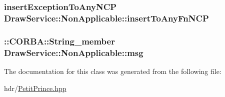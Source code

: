 \subsubsection[{\texorpdfstring{insert\+To\+Any\+Fn\+N\+CP}{insertToAnyFnNCP}}]{ insert\+Exception\+To\+Any\+N\+CP Draw\+Service\+::\+Non\+Applicable\+::insert\+To\+Any\+Fn\+N\+CP\hspace{0.3cm}{\ttfamily [static]}}\hypertarget{class_draw_service_1_1_non_applicable_a1616cdc51c85c7a0b695c5977cd7ef2e}{}\label{class_draw_service_1_1_non_applicable_a1616cdc51c85c7a0b695c5977cd7ef2e}
\subsubsection[{\texorpdfstring{msg}{msg}}]{\setlength{\rightskip}{0pt plus 5cm}\+::C\+O\+R\+B\+A\+::\+String\+\_\+member Draw\+Service\+::\+Non\+Applicable\+::msg}\hypertarget{class_draw_service_1_1_non_applicable_a80d5412b7ad22c14c85808108d88e6c8}{}\label{class_draw_service_1_1_non_applicable_a80d5412b7ad22c14c85808108d88e6c8}


The documentation for this class was generated from the following file\+:\begin{DoxyCompactItemize}
\item 
hdr/\hyperlink{_petit_prince_8hpp}{Petit\+Prince.\+hpp}\end{DoxyCompactItemize}
